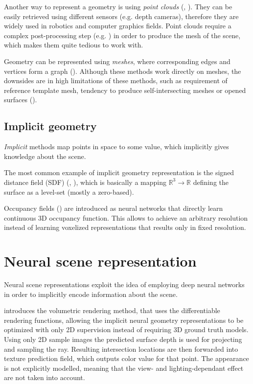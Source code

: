 Another way to represent a geometry is using \textit{point clouds} (\cite{qi2017pointnet}, \cite{fan2016point}).
They can be easily retrieved using different sensors (e.g. depth cameras),
therefore they are widely used in robotics and computer graphics fields.
Point clouds require a complex post-processing step
(e.g. \cite{ballpivoting1999bernardini}) in order to produce the mesh of the scene,
which makes them quite tedious to work with.

Geometry can be represented using \textit{meshes},
where corresponding edges and vertices form a graph (\cite{wang20183d}).
Although these methods work directly on meshes,
the downsides are in high limitations of these methods,
such as requirement of reference template mesh,
tendency to produce self-intersecting meshes or opened surfaces (\cite{groueix2018atlasnet}).

\subsection{Implicit geometry}

\textit{Implicit} methods map points in space to some value,
which implicitly gives knowledge about the scene.

The most common example of implicit geometry representation is the signed distance field (SDF) (\cite{truncdistfield1996curless}, \cite{Lombardi_2019}),
which is basically a mapping $\mathbb{R}^3 \xrightarrow{} \mathbb{R}$ defining the surface as a level-set (mostly a zero-based).

Occupancy fields (\cite{occupancy2019mescheder}) are introduced as neural networks
that directly learn continuous 3D occupancy function.
This allows to achieve an arbitrary resolution
instead of learning voxelized representations
that results only in fixed resolution.






\section{Neural scene representation}

Neural scene representations exploit the idea of employing
deep neural networks in order to implicitly encode information about the scene.

\cite{niemeyer2020differentiable} introduces the volumetric rendering method,
that uses the differentiable rendering functions,
allowing the implicit neural geometry representations to be optimized
with only 2D supervision instead of requiring 3D ground truth models.
Using only 2D sample images the predicted surface depth is used
for projecting and sampling the ray.
Resulting intersection locations are then forwarded into texture prediction field,
which outputs color value for that point.
The appearance is not explicitly modelled, meaning that the view- and lighting-dependant effect are not taken into account.


